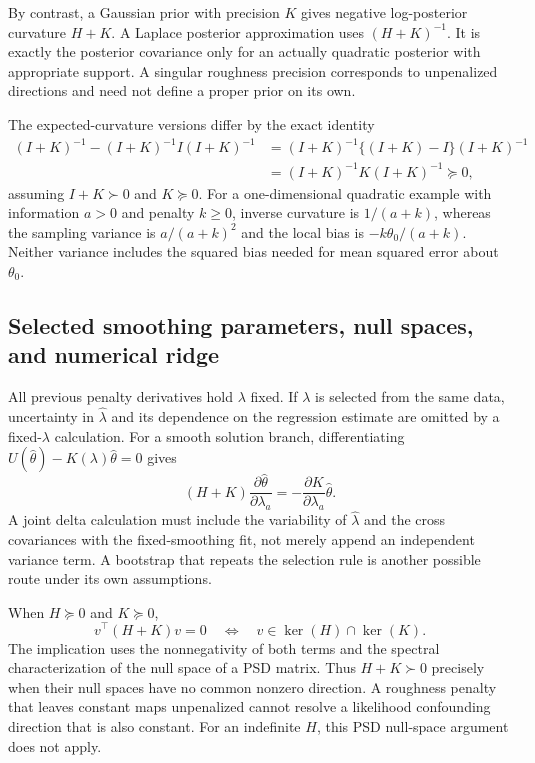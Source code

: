 By contrast, a Gaussian prior with precision $K$ gives negative
log-posterior curvature $H+K$.  A Laplace posterior approximation uses
$(H+K)^{-1}$.  It is exactly the posterior covariance only for an
actually quadratic posterior with appropriate support.  A singular
roughness precision corresponds to unpenalized directions and need
not define a proper prior on its own.

The expected-curvature versions differ by the exact identity
\begin{align}
 (I+K)^{-1}-(I+K)^{-1}I(I+K)^{-1}
 &=(I+K)^{-1}\{(I+K)-I\}(I+K)^{-1}\\
 &=(I+K)^{-1}K(I+K)^{-1}\succeq0,
 \label{cov-penalty-covariance-gap}
\end{align}
assuming $I+K\succ0$ and $K\succeq0$.
For a one-dimensional quadratic example with information $a>0$ and
penalty $k\geq0$, inverse curvature is $1/(a+k)$, whereas the
sampling variance is $a/(a+k)^2$ and the local bias is
$-k\theta_0/(a+k)$.  Neither variance includes the squared bias
needed for mean squared error about $\theta_0$.

\subsection{Selected smoothing parameters, null spaces, and numerical ridge}
\label{cov-penalty-selection}

All previous penalty derivatives hold $\lambda$ fixed.  If $\lambda$
is selected from the same data, uncertainty in $\widehat\lambda$
and its dependence on the regression estimate are omitted by a
fixed-$\lambda$ calculation.  For a smooth solution branch,
differentiating $U(\widehat\theta)-K(\lambda)\widehat\theta=0$
gives
\[
 (H+K)\frac{\partial\widehat\theta}{\partial\lambda_a}
       =-\frac{\partial K}{\partial\lambda_a}\widehat\theta .
\]
A joint delta calculation must include the variability of
$\widehat\lambda$ and the cross covariances with the fixed-smoothing
fit, not merely append an independent variance term.  A bootstrap
that repeats the selection rule is another possible route under its
own assumptions.

When $H\succeq0$ and $K\succeq0$,
\[
 v^\top(H+K)v=0
 \quad\Longleftrightarrow\quad v\in\ker(H)\cap\ker(K).
\]
The implication uses the nonnegativity of both terms and the spectral
characterization of the null space of a PSD matrix.  Thus
$H+K\succ0$ precisely when their null spaces have no common nonzero
direction.  A roughness penalty that leaves constant maps unpenalized
cannot resolve a likelihood confounding direction that is also constant.
For an indefinite $H$, this PSD null-space argument does not apply.


